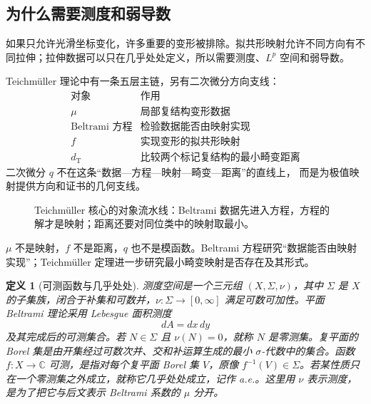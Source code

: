 \documentclass[UTF8,fontset=none,a4paper,11pt]{ctexart}
\theoremstyle{foundation-definition}
\newtheorem{definition}{定义}[section]
\theoremstyle{foundation-theorem}
\theoremstyle{foundation-proposition}
\theoremstyle{foundation-example}
\theoremstyle{foundation-remark}
\theoremstyle{foundation-theorem}
\begin{document}
\subsection{为什么需要测度和弱导数}

如果只允许光滑坐标变化，许多重要的变形被排除。拟共形映射允许不同方向有不同拉伸；拉伸数据可以只在几乎处处定义，所以需要测度、\(L^p\) 空间和弱导数。

Teichmüller 理论中有一条五层主链，另有二次微分方向支线：
\[
\begin{array}{c|c}
\text{对象}&\text{作用}\\
\hline
\mu&\text{局部复结构变形数据}\\
\text{Beltrami 方程}&\text{检验数据能否由映射实现}\\
f&\text{实现变形的拟共形映射}\\
d_{\mathrm T}&\text{比较两个标记复结构的最小畸变距离}
\end{array}
\]
二次微分 \(q\) 不在这条“数据—方程—映射—畸变—距离”的直线上，
而是为极值映射提供方向和证书的几何支线。
\begin{figure}[htbp]
\centering
{}
\caption{Teichmüller 核心的对象流水线：Beltrami 数据先进入方程，方程的解才是映射；距离还要对同位类中的映射取最小。}
\label{fig:beltrami-object-pipeline}
\end{figure}

\(\mu\) 不是映射，\(f\) 不是距离，\(q\) 也不是模函数。Beltrami 方程研究“数据能否由映射实现”；Teichmüller 定理进一步研究最小畸变映射是否存在及其形式。

\begin{definition}[可测函数与几乎处处]\label{def:measurable}
测度空间是一个三元组 \((X,\Sigma,\nu)\)，其中 \(\Sigma\) 是 \(X\) 的子集族，闭合于补集和可数并，\(\nu:\Sigma\to[0,\infty]\) 满足可数可加性。平面 Beltrami 理论采用 Lebesgue 面积测度
\[
dA=dx\,dy
\]
及其完成后的可测集合。若 \(N\in\Sigma\) 且 \(\nu(N)=0\)，就称 \(N\) 是零测集。复平面的 Borel 集是由开集经过可数次并、交和补运算生成的最小 \(\sigma\)-代数中的集合。函数 \(f:X\to\mathbb C\) 可测，是指对每个复平面 Borel 集 \(V\)，原像 \(f^{-1}(V)\in\Sigma\)。若某性质只在一个零测集之外成立，就称它几乎处处成立，记作 a.e.。这里用 \(\nu\) 表示测度，是为了把它与后文表示 Beltrami 系数的 \(\mu\) 分开。
\end{definition}
\end{document}
